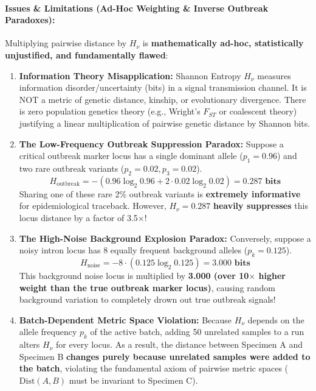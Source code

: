 \documentclass[11pt,a4paper]{article}
\begin{document}
\paragraph{Issues \& Limitations (Ad-Hoc Weighting \& Inverse Outbreak Paradoxes):}
Multiplying pairwise distance by $H_\nu$ is \textbf{mathematically ad-hoc, statistically unjustified, and fundamentally flawed}:
\begin{enumerate}[leftmargin=*]
    \item \textbf{Information Theory Misapplication:} Shannon Entropy $H_\nu$ measures information disorder/uncertainty (bits) in a signal transmission channel. It is NOT a metric of genetic distance, kinship, or evolutionary divergence. There is zero population genetics theory (e.g., Wright's $F_{ST}$ or coalescent theory) justifying a linear multiplication of pairwise genetic distance by Shannon bits.
    \item \textbf{The Low-Frequency Outbreak Suppression Paradox:} Suppose a critical outbreak marker locus has a single dominant allele ($p_1 = 0.96$) and two rare outbreak variants ($p_2 = 0.02, p_3 = 0.02$).
    \begin{equation}
    H_{\text{outbreak}} = -(0.96 \log_2 0.96 + 2 \cdot 0.02 \log_2 0.02) = \mathbf{0.287 \text{ bits}}
    \end{equation}
    Sharing one of these rare 2\% outbreak variants is \textbf{extremely informative} for epidemiological traceback. However, $H_\nu = 0.287$ \textbf{heavily suppresses} this locus distance by a factor of 3.5$\times$!
    \item \textbf{The High-Noise Background Explosion Paradox:} Conversely, suppose a noisy intron locus has 8 equally frequent background alleles ($p_k = 0.125$).
    \begin{equation}
    H_{\text{noise}} = -8 \cdot (0.125 \log_2 0.125) = \mathbf{3.000 \text{ bits}}
    \end{equation}
    This background noise locus is multiplied by \textbf{3.000 (over 10$\times$ higher weight than the true outbreak marker locus)}, causing random background variation to completely drown out true outbreak signals!
    \item \textbf{Batch-Dependent Metric Space Violation:} Because $H_\nu$ depends on the allele frequency $p_k$ of the active batch, adding 50 unrelated samples to a run alters $H_\nu$ for every locus. As a result, the distance between Specimen A and Specimen B \textbf{changes purely because unrelated samples were added to the batch}, violating the fundamental axiom of pairwise metric spaces ($\text{Dist}(A, B)$ must be invariant to Specimen C).
\end{enumerate}
\end{document}

